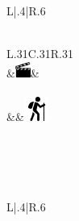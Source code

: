 \documentclass{article}
\begin{document}
\begin{adjustwidth}{-1.5cm}{-1.5cm}
\begin{vwcol}[widths={0.3,0.6},
 sep=3.5cm, justify=top,rule=0pt,indent=0em]
\begin{minipage}[t]{0.37\textwidth}
 \begin{tabular}{L{|.4\textwidth}|R{.6\textwidth}}
	       \\
	        \\
	    \end{tabular}
	     \begin{tabular}{L{.31\textwidth}C{.31\textwidth}R{.31\textwidth}}
	       \\
	     \Large\faBicycle&{\includegraphics[width=0.5cm]{kino}}&\Large\faCode\\
	        \\
	     \Large\faMusic&\Large\faPlane&{\includegraphics[width=0.8cm]{hikingg}}\\
	       \\
	       \\
	       \\
	       \\
	    \end{tabular}
	\end{minipage}
	\hspace{1.5cm}
	
\begin{minipage}[t]{0.7\textwidth}
 \begin{tabular}{L{|.4\textwidth}|R{.6\textwidth}}
       \\
        \\
    \end{tabular}
  

\end{minipage}
\end{vwcol}
\end{adjustwidth}
\end{document}
